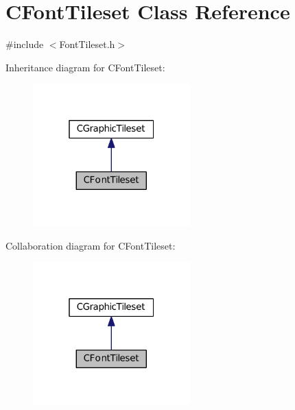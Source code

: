 \hypertarget{classCFontTileset}{}\section{C\+Font\+Tileset Class Reference}
\label{classCFontTileset}


{\ttfamily \#include $<$Font\+Tileset.\+h$>$}



Inheritance diagram for C\+Font\+Tileset\+:
\nopagebreak
\begin{figure}[H]
\begin{center}
\leavevmode
\includegraphics[width=172pt]{classCFontTileset__inherit__graph}
\end{center}
\end{figure}


Collaboration diagram for C\+Font\+Tileset\+:
\nopagebreak
\begin{figure}[H]
\begin{center}
\leavevmode
\includegraphics[width=172pt]{classCFontTileset__coll__graph}
\end{center}
\end{figure}
